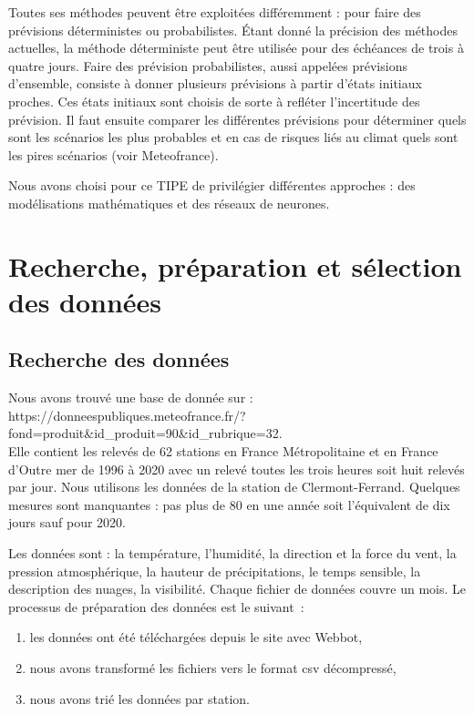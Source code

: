 \documentclass[11pt,a4paper]{article}
\begin{document}
Toutes ses méthodes peuvent être exploitées différemment : pour faire des prévisions déterministes ou probabilistes. Étant donné la précision des méthodes actuelles, la méthode déterministe peut être utilisée pour des échéances de trois à quatre jours. Faire des prévision probabilistes, aussi appelées prévisions d'ensemble, consiste à donner plusieurs prévisions à partir d'états initiaux proches. Ces états initiaux sont choisis de sorte à refléter l'incertitude des prévision. Il faut ensuite comparer les différentes prévisions pour déterminer quels sont les scénarios les plus probables et en cas de risques liés au climat quels sont les pires scénarios (voir Meteofrance).

\vspace{0.6cm}
Nous avons choisi pour ce TIPE de privilégier différentes approches : des modélisations mathématiques et des réseaux de neurones.

\section{Recherche, préparation et sélection des données}
\subsection{Recherche des données}
Nous avons trouvé une base de donnée sur  : \\
https://donneespubliques.meteofrance.fr/?fond=produit\&id\_produit=90\&id\_rubrique=32. \\
Elle contient les relevés de 62 stations en France Métropolitaine et en France d’Outre mer
de 1996 à 2020 avec un relevé toutes les trois heures soit huit relevés par jour. Nous utilisons les données de la station de Clermont-Ferrand. Quelques mesures sont manquantes : pas plus de 80 en une année soit l'équivalent de dix jours sauf pour 2020. 

Les données sont : la température, l'humidité, la direction et la force du vent, la pression atmosphérique, la hauteur de précipitations, le temps sensible, la description des nuages, la visibilité. 
Chaque fichier de données couvre un mois. Le processus de préparation des données est le suivant~: 
\begin{enumerate}
\item les données ont été téléchargées depuis le site avec Webbot, 
\item nous avons transformé les fichiers vers le format csv décompressé, 
\item nous avons trié les données par station. 
\end{enumerate}
\end{document}
